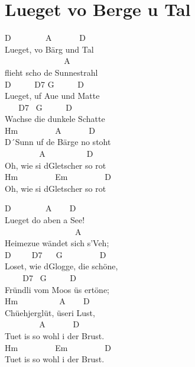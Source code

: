 \documentclass[
  letterpaper,
  twoside=false]{scrbook}
\begin{document}
\hypertarget{lueget-vo-berge-u-tal}{%
\chapter{Lueget vo Berge u Tal}\label{lueget-vo-berge-u-tal}}

D ~ ~ ~ ~ ~A ~ ~ ~ ~D\\
Lueget, vo Bärg und Tal\\
\hspace*{0.333em} ~ ~ ~ ~ ~ ~ ~ ~ ~A\\
flieht scho de Sunnestrahl\\
D ~ ~ ~ D7 G ~ ~ ~ D\\
Lueget, uf Aue und Matte\\
\hspace*{0.333em} ~ ~ D7 ~G ~ ~ ~ D\\
Wachse die dunkele Schatte\\
Hm ~ ~ ~ ~ ~ A ~ ~ ~ ~D\\
D´Sunn uf de Bärge no stoht\\
\hspace*{0.333em} ~ ~ ~ ~ ~ A ~ ~ ~ ~ ~ ~D\\
Oh, wie si d\textquotesingle Gletscher so rot\\
Hm ~ ~ ~ ~ ~ Em ~ ~ ~ ~ ~ D\\
Oh, wie si d\textquotesingle Gletscher so rot

D ~ ~ ~ ~ ~A ~ ~~D\\
Lueget do aben a See!\\
\hspace*{0.333em} ~ ~ ~ ~ ~ ~ ~ ~ ~ ~~A\\
Heimezue wändet sich s'Veh;\\
D ~ ~ ~D7 ~ ~G ~ ~ ~ ~ ~ D\\
Loset, wie d\textquotesingle Glogge, die schöne,\\
\hspace*{0.333em} ~ ~ ~D7 ~G ~ ~ ~ D\\
Fründli vom Moos üs ertöne;\\
Hm ~ ~ ~ ~ ~ ~A ~~ ~D\\
Chüehjerglüt, üseri Lust,\\
\hspace*{0.333em} ~ ~ ~ ~ ~ A ~ ~ ~ ~D\\
Tuet is so wohl i der Brust.\\
Hm ~ ~ ~ ~ ~ Em ~ ~ ~ ~ ~ D\\
Tuet is so wohl i der Brust.
\end{document}

